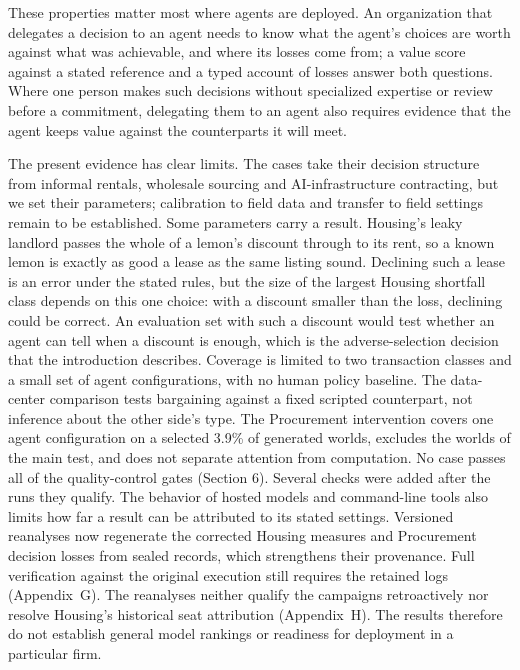 These properties matter most where agents are deployed. An organization
that delegates a decision to an agent needs to know what the agent's
choices are worth against what was achievable, and where its losses come
from; a value score against a stated reference and a typed account of
losses answer both questions. Where one person makes such decisions
without specialized expertise or review before a commitment, delegating
them to an agent also requires evidence that the agent keeps value against
the counterparts it will meet.

The present evidence has clear limits. The cases take their decision
structure from informal rentals, wholesale sourcing and AI-infrastructure
contracting, but we set their parameters; calibration to
field data and transfer to field settings remain to be established.
Some parameters carry a result. Housing's leaky landlord passes the whole of a
lemon's discount through to its rent, so a known lemon is exactly as good a
lease as the same listing sound. Declining such a lease is an error under the
stated rules, but the size of the largest Housing shortfall class depends on
this one choice: with a discount smaller than the loss, declining could be
correct. An evaluation set with such a discount would test whether an agent can
tell when a discount is enough, which is the adverse-selection decision that
the introduction describes.
Coverage is limited to two transaction classes and a small set of agent
configurations, with no human policy baseline. The data-center comparison tests bargaining
against a fixed scripted counterpart, not inference about the other side's type. The Procurement intervention
covers one agent configuration on a selected 3.9\% of generated worlds, excludes the worlds of the main test, and
does not separate attention from computation. No case passes all of the
quality-control gates (Section 6). Several checks were added after the runs
they qualify. The behavior of hosted models and command-line tools also limits
how far a result can be attributed to its stated settings.
Versioned reanalyses now regenerate the corrected Housing measures and
Procurement decision losses from sealed records, which strengthens their
provenance. Full verification against the original execution still
requires the retained logs (Appendix~G). The reanalyses neither qualify the
campaigns retroactively nor resolve Housing's historical seat attribution
(Appendix~H). The results therefore do not establish general model rankings
or readiness for deployment in a particular firm.

